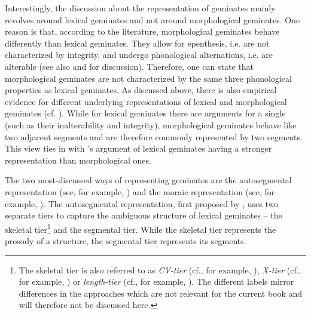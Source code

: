Interestingly, the discussion about the representation of geminates mainly revolves around  lexical geminates and not around morphological  geminates. One reason is that, according to the literature,  morphological geminates behave differently than  lexical geminates. They allow for epenthesis, i.e. are not characterized by integrity, and  undergo phonological alternations, i.e. are alterable (see also \citealt{Kenstowicz.1994,Kirchner.2001} and \citealt{Ridouane.2010} for discussion). Therefore, one can state that  morphological geminates are not characterized by  the same three phonological properties as  lexical geminates. 
As discussed above, there is also empirical evidence for different underlying representations of lexical and  morphological geminates (cf. \citealt{Ridouane.2010,Galea.2014}). While for  lexical geminates there are arguments for a single  (such as their inalterability and integrity),  morphological geminates behave like two adjacent segments and are therefore commonly represented by two segments. This view ties in with \citeauthor{Ridouane.2010}'s argument of  lexical geminates having a stronger representation than morphological ones.

The two most-discussed ways of representing geminates are the {autosegmental representation} (see, for example, \citealt{Leben.1980,Hayes.1986b,Levin.1985,Ridouane.2010}) and the {moraic representation}  (see, for example, \citealt{Hayes.1989,Davis.2014,Topintzi.2008}). 
The {autosegmental representation}, first proposed by \cite{Leben.1980}, uses two separate tiers to capture the ambiguous structure of  lexical geminates -- the skeletal tier\footnote{The skeletal tier is also referred to as \textit{CV-tier} (cf., for example, \citealt{Hayes.1986b, Ridouane.2010,Ridouane.2017}), \textit{X-tier} (cf., for example, \citealt{Levin.1985}) or  \textit{length-tier} (cf., for example, \citealt{Vago.2011}). The different labels mirror differences in the approaches which are not relevant for the current book and will therefore not be discussed here.}
and the segmental tier. While the skeletal tier represents the prosody of a structure, the segmental tier represents its segments. 

